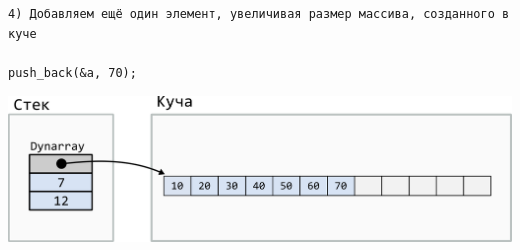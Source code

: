 \documentclass{article}
\begin{document}
\noindent\begin{minipage}{.40\textwidth}
\begin{lstlisting}
4) Добавляем ещё один элемент, увеличивая размер массива, созданного в куче

push_back(&a, 70);
\end{lstlisting}
\end{minipage}
\begin{minipage}{.50\textwidth}
\includegraphics[scale=0.8]{../images/dynarray4.png}
\end{minipage}
\quad\\
\quad\\
\quad\\


\newpage
\end{document}
